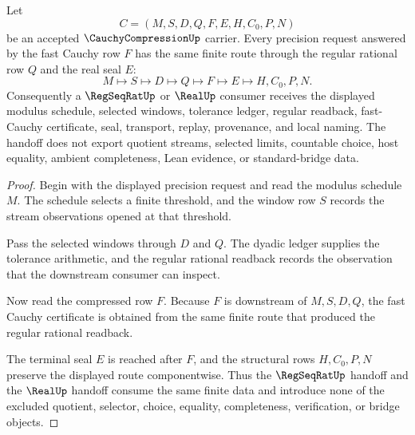 \begin{theorem}
\label{thm:cauchy-compression-regseqrat-handoff}
Let
$$
C=(M,S,D,Q,F,E,H,C_0,P,N)
$$
be an accepted $\CauchyCompressionUp$ carrier. Every precision request answered by the fast Cauchy row $F$ has the same finite route through the regular rational row $Q$ and the real seal $E$:
$$
M\longmapsto S\longmapsto D\longmapsto Q\longmapsto F\longmapsto E\longmapsto H,C_0,P,N .
$$
Consequently a $\RegSeqRatUp$ or $\RealUp$ consumer receives the displayed modulus schedule, selected windows, tolerance ledger, regular readback, fast-Cauchy certificate, seal, transport, replay, provenance, and local naming. The handoff does not export quotient streams, selected limits, countable choice, host equality, ambient completeness, Lean evidence, or standard-bridge data.
\end{theorem}
\begin{proof}
Begin with the displayed precision request and read the modulus schedule $M$. The schedule selects a finite threshold, and the window row $S$ records the stream observations opened at that threshold.

Pass the selected windows through $D$ and $Q$. The dyadic ledger supplies the tolerance arithmetic, and the regular rational readback records the observation that the downstream consumer can inspect.

Now read the compressed row $F$. Because $F$ is downstream of $M,S,D,Q$, the fast Cauchy certificate is obtained from the same finite route that produced the regular rational readback.

The terminal seal $E$ is reached after $F$, and the structural rows $H,C_0,P,N$ preserve the displayed route componentwise. Thus the $\RegSeqRatUp$ handoff and the $\RealUp$ handoff consume the same finite data and introduce none of the excluded quotient, selector, choice, equality, completeness, verification, or bridge objects.
\end{proof}



